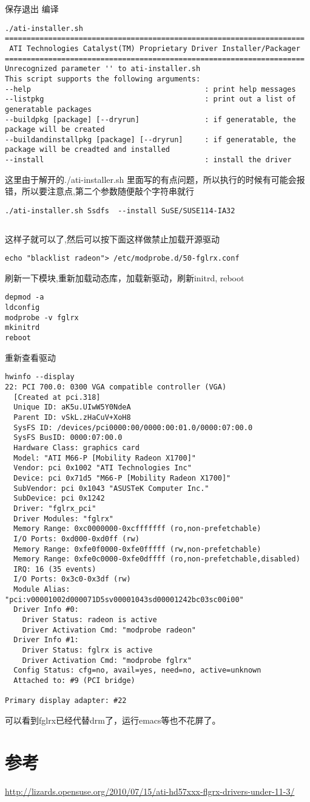 \documentclass[adobefonts]{ctexart}
\begin{document}
保存退出
编译
\begin{verbatim}
./ati-installer.sh 
=====================================================================
 ATI Technologies Catalyst(TM) Proprietary Driver Installer/Packager 
=====================================================================
Unrecognized parameter '' to ati-installer.sh
This script supports the following arguments:
--help                                        : print help messages
--listpkg                                     : print out a list of generatable packages
--buildpkg [package] [--dryrun]               : if generatable, the package will be created
--buildandinstallpkg [package] [--dryrun]     : if generatable, the package will be creadted and installed
--install                                     : install the driver

\end{verbatim}
这里由于解开的./ati-installer.sh 里面写的有点问题，所以执行的时候有可能会报错，所以要注意点,第二个参数随便敲个字符串就行
\begin{verbatim}
./ati-installer.sh Ssdfs  --install SuSE/SUSE114-IA32
\end{verbatim}

\begin{verbatim}
\end{verbatim}
这样子就可以了,然后可以按下面这样做禁止加载开源驱动
\begin{verbatim}
echo "blacklist radeon"> /etc/modprobe.d/50-fglrx.conf
\end{verbatim}
刷新一下模块,重新加载动态库，加载新驱动，刷新initrd, reboot
\begin{verbatim}
depmod -a
ldconfig
modprobe -v fglrx
mkinitrd
reboot
\end{verbatim}
重新查看驱动
\begin{verbatim}
hwinfo --display
22: PCI 700.0: 0300 VGA compatible controller (VGA)             
  [Created at pci.318]
  Unique ID: aK5u.UIwW5Y0NdeA
  Parent ID: vSkL.zHaCuV+XoH8
  SysFS ID: /devices/pci0000:00/0000:00:01.0/0000:07:00.0
  SysFS BusID: 0000:07:00.0
  Hardware Class: graphics card
  Model: "ATI M66-P [Mobility Radeon X1700]"
  Vendor: pci 0x1002 "ATI Technologies Inc"
  Device: pci 0x71d5 "M66-P [Mobility Radeon X1700]"
  SubVendor: pci 0x1043 "ASUSTeK Computer Inc."
  SubDevice: pci 0x1242 
  Driver: "fglrx_pci"
  Driver Modules: "fglrx"
  Memory Range: 0xc0000000-0xcfffffff (ro,non-prefetchable)
  I/O Ports: 0xd000-0xd0ff (rw)
  Memory Range: 0xfe0f0000-0xfe0fffff (rw,non-prefetchable)
  Memory Range: 0xfe0c0000-0xfe0dffff (ro,non-prefetchable,disabled)
  IRQ: 16 (35 events)
  I/O Ports: 0x3c0-0x3df (rw)
  Module Alias: "pci:v00001002d000071D5sv00001043sd00001242bc03sc00i00"
  Driver Info #0:
    Driver Status: radeon is active
    Driver Activation Cmd: "modprobe radeon"
  Driver Info #1:
    Driver Status: fglrx is active
    Driver Activation Cmd: "modprobe fglrx"
  Config Status: cfg=no, avail=yes, need=no, active=unknown
  Attached to: #9 (PCI bridge)

Primary display adapter: #22

\end{verbatim}
可以看到fglrx已经代替drm了，运行emacs等也不花屏了。
\section{参考}
\href{ATI HD57xxx fglrx drivers under 11.3 & 11.4}{http://lizards.opensuse.org/2010/07/15/ati-hd57xxx-flgrx-drivers-under-11-3/}

\end{document}

